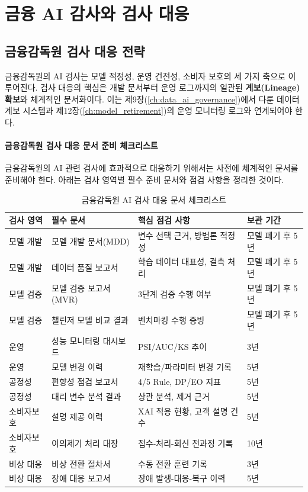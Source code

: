 \section{금융 AI 감사와 검사 대응}
\label{sec:17.3}

\subsection{금융감독원 검사 대응 전략}
\label{sec:17.3.1}

금융감독원의 AI 검사는 모델 적정성, 운영 건전성, 소비자 보호의 세 가지 축으로 이루어진다. 검사 대응의 핵심은 개발 문서부터 운영 로그까지의 일관된 \textbf{계보(Lineage) 확보}와 체계적인 문서화이다. 이는 제9장(\ref{ch:data_ai_governance})에서 다룬 데이터 계보 시스템과 제12장(\ref{ch:model_retirement})의 운영 모니터링 로그와 연계되어야 한다.

\paragraph{금융감독원 검사 대응 문서 준비 체크리스트}

금융감독원의 AI 관련 검사에 효과적으로 대응하기 위해서는 사전에 체계적인 문서를 준비해야 한다. 아래는 검사 영역별 필수 준비 문서와 점검 사항을 정리한 것이다.

\begin{table}[htbp]
\centering
\caption{금융감독원 AI 검사 대응 문서 체크리스트}
\label{tab:17_fss_checklist}
\begin{tabularx}{\textwidth}{p{2.5cm}p{4cm}Xp{1.5cm}}
\toprule
\textbf{검사 영역} & \textbf{필수 문서} & \textbf{핵심 점검 사항} & \textbf{보관 기간} \\
\midrule
모델 개발 & 모델 개발 문서(MDD) & 변수 선택 근거, 방법론 적정성 & 모델 폐기 후 5년 \\
모델 개발 & 데이터 품질 보고서 & 학습 데이터 대표성, 결측 처리 & 모델 폐기 후 5년 \\
모델 검증 & 모델 검증 보고서(MVR) & 3단계 검증 수행 여부 & 모델 폐기 후 5년 \\
모델 검증 & 챌린저 모델 비교 결과 & 벤치마킹 수행 증빙 & 모델 폐기 후 5년 \\
운영 & 성능 모니터링 대시보드 & PSI/AUC/KS 추이 & 3년 \\
운영 & 모델 변경 이력 & 재학습/파라미터 변경 기록 & 5년 \\
공정성 & 편향성 점검 보고서 & 4/5 Rule, DP/EO 지표 & 5년 \\
공정성 & 대리 변수 분석 결과 & 상관 분석, 제거 근거 & 5년 \\
소비자보호 & 설명 제공 이력 & XAI 적용 현황, 고객 설명 건수 & 5년 \\
소비자보호 & 이의제기 처리 대장 & 접수-처리-회신 전과정 기록 & 10년 \\
비상 대응 & 비상 전환 절차서 & 수동 전환 훈련 기록 & 3년 \\
비상 대응 & 장애 대응 보고서 & 장애 발생-대응-복구 이력 & 5년 \\
\bottomrule
\end{tabularx}
\end{table}

